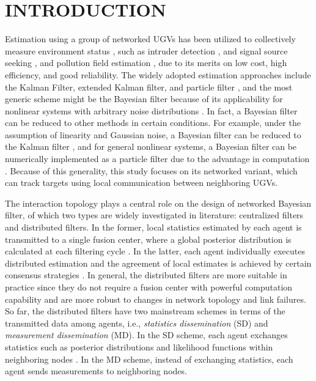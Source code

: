 \section{INTRODUCTION}
	
	Estimation using a group of networked UGVs has been utilized to collectively measure environment status \cite{hedrick2011tools}, such as intruder detection \cite{chamberland2007wireless}, and signal source seeking \cite{atanasov2015distributed}, and pollution field estimation \cite{madhag2017distributed},
	due to its merits on low cost, high efficiency, and good reliability.
	The widely adopted estimation approaches include the Kalman Filter, extended Kalman filter, and particle filter \cite{thrun2005probabilistic}, and
	the most generic scheme might be the Bayesian filter because of its applicability for nonlinear systems with arbitrary noise distributions \cite{bandyopadhyay2014distributed,julian2012distributed}.
	In fact, a Bayesian filter can be reduced to other methods in certain conditions.
	For example, under the assumption of linearity and Gaussian noise, a Bayesian filter can be reduced to the Kalman filter \cite{chen2003bayesian}, and for general nonlinear systems, a Bayesian filter can be numerically implemented as a particle filter due to the advantage in computation \cite{chen2003bayesian}.
	Because of this generality, this study focuses on its networked variant, which can track targets using local communication between neighboring UGVs. %
	
	The interaction topology plays a central role on the design of networked Bayesian filter, of which two types are widely investigated in literature: centralized filters and distributed filters.
	In the former, local statistics estimated by each agent is transmitted to a single fusion center, where a global posterior distribution is calculated at each filtering cycle \cite{zuo2006bandwidth,vemula2006target}. 
	In the latter, each agent individually executes distributed estimation and the agreement of local estimates is achieved by certain consensus strategies \cite{jadbabaie2003coordination,ren2005consensus,olfati2007consensus}.
	In general, the distributed filters are more suitable in practice since they do not require a fusion center with powerful computation capability and are more robust to changes in network topology and link failures. 
	So far, the distributed filters have two mainstream schemes in terms of the transmitted data among agents, i.e., \textit{statistics dissemination} (SD) and \textit{measurement dissemination} (MD). 
	In the SD scheme, each agent exchanges statistics such as posterior distributions and likelihood functions within neighboring nodes \cite{hlinka2013distributed}. 
	In the MD scheme, instead of exchanging statistics, each agent sends measurements to neighboring nodes. 
	
